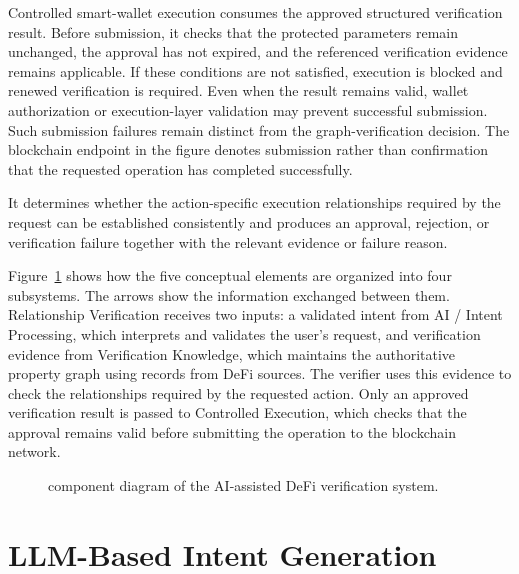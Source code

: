 Controlled smart-wallet execution consumes the approved structured
verification result. Before submission, it checks that the
protected parameters remain unchanged, the approval has not expired, and
the referenced verification evidence remains applicable. If these conditions
are not satisfied, execution is blocked and renewed verification is required.
Even when the result remains valid, wallet authorization or execution-layer
validation may prevent successful submission. Such submission failures remain
distinct from the graph-verification decision. The blockchain endpoint in the
figure denotes submission rather than confirmation that the requested
operation has completed successfully.


It determines whether the action-specific execution relationships required
by the request can be established consistently and produces an approval,
rejection, or verification failure together with the relevant evidence
or failure reason.

Figure~\ref{fig:system_architecture} shows how the five conceptual elements
are organized into four subsystems. The arrows show the information exchanged
between them. Relationship Verification receives two inputs: a validated
intent from AI / Intent Processing, which interprets and validates the user's
request, and verification evidence from Verification Knowledge, which maintains
the authoritative property graph using records from DeFi sources. The verifier
uses this evidence to check the relationships required by the requested action.
Only an approved verification result is passed to Controlled Execution, which
checks that the approval remains valid before submitting the operation to the
blockchain network.

\begin{figure}[H]
    \centering
    \resizebox{0.98\textwidth}{!}{%
    }
   \caption{component diagram of the AI-assisted DeFi verification system.}
    \label{fig:system_architecture}
\end{figure}




\section{LLM-Based Intent Generation}
\label{sec:intent_generation}

